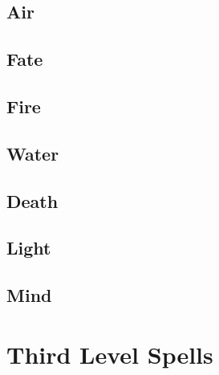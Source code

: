 \begin{multicols}{2}

\subsection{Air}



\subsection{Fate}



\subsection{Fire}



\subsection{Water}



\subsection{Death}



\subsection{Light}



\subsection{Mind}



\end{multicols}

\section{Third Level Spells}

